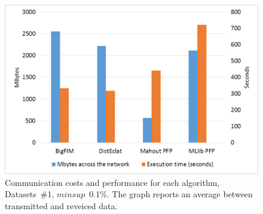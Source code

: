 \begin{figure}[!t]
\begin{center}
\includegraphics[width=5in]{chapters/survey/immagini/comm_costs.png}
\caption{Communication costs and performance for each algorithm,
Datasets~\#1, $minsup$~0.1\%.
The graph reports an average between transmitted and reveiced data.}
\label{comm_costs}
\end{center}
\end{figure}

%

